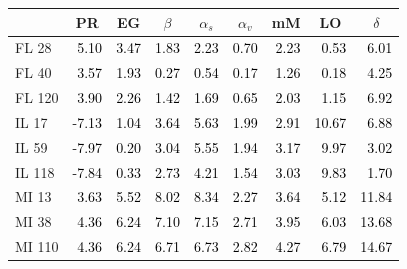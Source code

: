 \documentclass{article}
\begin{document}
\begin{tabular}{lrrrrrrrr}
\toprule
 & \multicolumn{1}{c}{PR} & \multicolumn{1}{c}{EG} & \multicolumn{1}{c}{$\beta$} & \multicolumn{1}{c}{$\alpha_s$} & \multicolumn{1}{c}{$\alpha_v$} & \multicolumn{1}{c}{mM} & \multicolumn{1}{c}{LO} & \multicolumn{1}{c}{$\delta$} \\
\midrule
FL 28 & \textcolor{black}{ 5.10 } & \textcolor{black}{ 3.47 } & \textcolor{black}{ 1.83 } & \textcolor{black}{ 2.23 } & \textcolor{black}{ 0.70 } & \textcolor{black}{ 2.23 } & \textcolor{black}{ 0.53 } & \textcolor{black}{ 6.01 } \\
FL 40 & \textcolor{black}{ 3.57 } & \textcolor{black}{ 1.93 } & \textcolor{black}{ 0.27 } & \textcolor{black}{ 0.54 } & \textcolor{black}{ 0.17 } & \textcolor{black}{ 1.26 } & \textcolor{black}{ 0.18 } & \textcolor{black}{ 4.25 } \\
FL 120 & \textcolor{black}{ 3.90 } & \textcolor{black}{ 2.26 } & \textcolor{black}{ 1.42 } & \textcolor{black}{ 1.69 } & \textcolor{black}{ 0.65 } & \textcolor{black}{ 2.03 } & \textcolor{black}{ 1.15 } & \textcolor{black}{ 6.92 } \\
IL 17 & \textcolor{black}{ -7.13 } & \textcolor{black}{ 1.04 } & \textcolor{black}{ 3.64 } & \textcolor{black}{ 5.63 } & \textcolor{black}{ 1.99 } & \textcolor{black}{ 2.91 } & \textcolor{black}{ 10.67 } & \textcolor{black}{ 6.88 } \\
IL 59 & \textcolor{black}{ -7.97 } & \textcolor{black}{ 0.20 } & \textcolor{black}{ 3.04 } & \textcolor{black}{ 5.55 } & \textcolor{black}{ 1.94 } & \textcolor{black}{ 3.17 } & \textcolor{black}{ 9.97 } & \textcolor{black}{ 3.02 } \\
IL 118 & \textcolor{black}{ -7.84 } & \textcolor{black}{ 0.33 } & \textcolor{black}{ 2.73 } & \textcolor{black}{ 4.21 } & \textcolor{black}{ 1.54 } & \textcolor{black}{ 3.03 } & \textcolor{black}{ 9.83 } & \textcolor{black}{ 1.70 } \\
MI 13 & \textcolor{black}{ 3.63 } & \textcolor{black}{ 5.52 } & \textcolor{black}{ 8.02 } & \textcolor{black}{ 8.34 } & \textcolor{black}{ 2.27 } & \textcolor{black}{ 3.64 } & \textcolor{black}{ 5.12 } & \textcolor{black}{ 11.84 } \\
MI 38 & \textcolor{black}{ 4.36 } & \textcolor{black}{ 6.24 } & \textcolor{black}{ 7.10 } & \textcolor{black}{ 7.15 } & \textcolor{black}{ 2.71 } & \textcolor{black}{ 3.95 } & \textcolor{black}{ 6.03 } & \textcolor{black}{ 13.68 } \\
MI 110 & \textcolor{black}{ 4.36 } & \textcolor{black}{ 6.24 } & \textcolor{black}{ 6.71 } & \textcolor{black}{ 6.73 } & \textcolor{black}{ 2.82 } & \textcolor{black}{ 4.27 } & \textcolor{black}{ 6.79 } & \textcolor{black}{ 14.67 } \\

\end{tabular}
\end{document}
